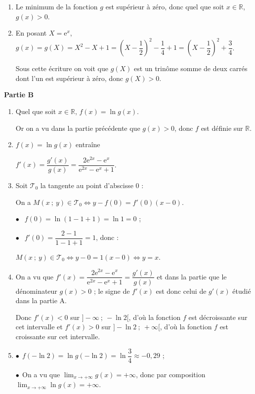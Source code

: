 \documentclass[10pt]{article}
\providecommand{\R}{\mathbb{R}}
\providecommand{\e}{{\mathrm{e}}}
\begin{document}
\begin{enumerate}
\item 
Le minimum de la fonction $g$ est supérieur à zéro, donc quel que soit $x \in \R$, \, $g(x) > 0.$
\item 


En posant $X = \e^x$, $g(x) = g(X) = X^2 - X +1 = \left(X - \dfrac12 \right)^2 - \dfrac14 + 1 = \left(X - \dfrac12 \right)^2 + \dfrac34$.

Sous cette écriture on voit que $g(X)$ est un trinôme somme de deux carrés dont l'un est supérieur à zéro, donc $g(X) > 0$.
\end{enumerate}

\medskip

\textbf{Partie B}

\medskip

\begin{enumerate}
\item 

Quel que soit $x \in \R$, \: $f(x) = \ln g(x)$.

Or on a vu dans la partie précédente que $g(x) > 0$, donc $f$ est définie sur $\R$.
\item 


$f(x) = \ln g(x)$ entraîne 

$f'(x) = \dfrac{g'(x)}{g(x)} = \dfrac{2\text{e}^{2x} - \text{e}^x}{\text{e}^{2x} - \text{e}^x + 1}$.
\item 
Soit $\mathcal{T}_0$ la tangente au point d'abscisse $0$ :

On a $M(x~;~y) \in \mathcal{T}_0 \iff y - f(0) = f'(0)(x - 0)$.

$\bullet ~~$ $f(0) = \ln(1 - 1 + 1) = \ln 1 = 0$ ;

$\bullet ~~$ $f'(0) = \dfrac{2 - 1}{1 - 1 + 1} = 1$, donc :

$M(x~;~y) \in \mathcal{T}_0 \iff y - 0 = 1(x - 0) \iff y = x$.
\item 
On a vu que $f'(x) = \dfrac{2\text{e}^{2x} - \text{e}^x}{\text{e}^{2x} - \text{e}^x + 1} = \dfrac{g'(x)}{g(x)}$ et dans la partie que le dénominateur $g(x) > 0$ ; le signe de $f'(x)$ est donc celui de $g'(x)$ étudié dans la partie A.

Donc $f'(x) < 0$ sur $]- \infty~;~- \ln 2[$, d'où la fonction $f$ est décroissante sur cet intervalle et $f'(x) > 0$ sur $]- \ln 2~;~+ \infty[$, d'où la fonction $f$ est croissante sur cet intervalle.
\item 
$\bullet~~$$f(-\ln 2) = \ln g(- \ln 2) =\ln \dfrac34 \approx- 0,29$ ;

$\bullet~~$On a vu que $\displaystyle\lim_{x \to + \infty} g(x) = + \infty$, donc par composition 
$\displaystyle\lim_{x \to + \infty} \ln g(x) = + \infty$.


\end{enumerate}
\end{document}
